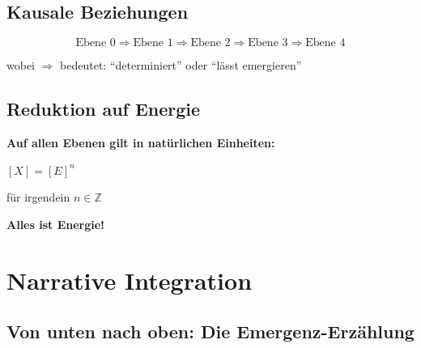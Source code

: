 \subsection{Kausale Beziehungen}

\begin{equation}
\text{Ebene 0} \Rightarrow \text{Ebene 1} \Rightarrow \text{Ebene 2} \Rightarrow \text{Ebene 3} \Rightarrow \text{Ebene 4}
\end{equation}

wobei $\Rightarrow$ bedeutet: \enquote{determiniert} oder \enquote{lässt emergieren}

\subsection{Reduktion auf Energie}

\begin{center}
\textbf{Auf allen Ebenen gilt in natürlichen Einheiten:}

\vspace{0.3cm}

 $[X] = [E]^n$

\vspace{0.3cm}

\normalsize für irgendein $n \in \mathbb{Z}$
\end{center}

\textbf{Alles ist Energie!}

\section{Narrative Integration}

\subsection{Von unten nach oben: Die Emergenz-Erzählung}

